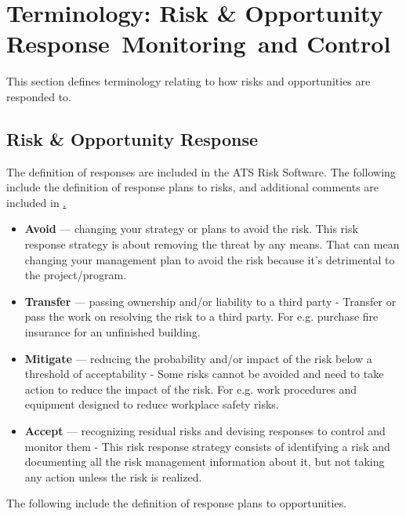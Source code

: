 \section{Terminology: Risk \& Opportunity Response\, Monitoring\, and Control}

This section defines terminology relating to how risks and opportunities are responded to.

\subsection {Risk \& Opportunity Response}

The definition of responses are included in the ATS Risk Software.
The following include the definition of response plans to risks, and additional comments are included in \href{RTN-051.lsst.io}.

\begin{itemize}
	\item \textbf{Avoid} ---
	changing your strategy or plans to avoid the risk. This risk response strategy is about removing the threat by any means. That can mean changing your management plan to avoid the risk because it’s detrimental to the project/program.

	\item \textbf{Transfer} ---
	passing ownership and/or liability to a third party - Transfer or pass the work on resolving the risk to a third party. For e.g. purchase fire insurance for an unfinished building.

	\item \textbf{Mitigate} ---
	reducing the probability and/or impact of the risk below a threshold of acceptability - Some risks cannot be avoided and need to take action to reduce the impact of the risk. For e.g. work procedures and equipment designed to reduce workplace safety risks.

	\item \textbf{Accept} ---
	recognizing residual risks and devising responses to control and monitor them - This risk response strategy consists of identifying a risk and documenting all the risk management information about it, but not taking any action unless the risk is realized.
\end{itemize}

The following include the definition of response plans to opportunities.

